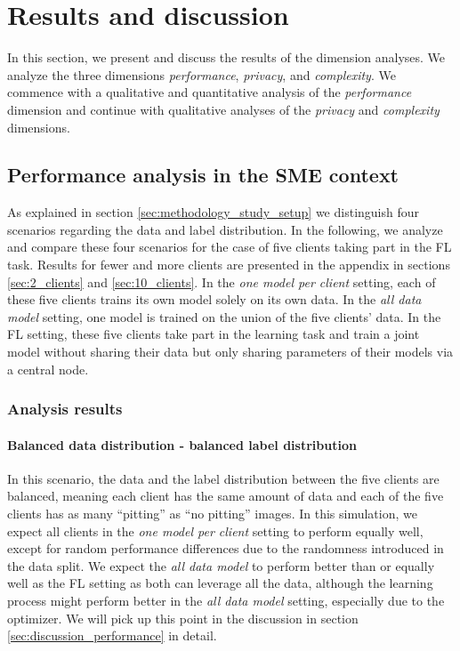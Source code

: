 \section{Results and discussion\label{sec:results_and_discussion}}
In this section, we present and discuss the results of the dimension analyses. We analyze the three dimensions \emph{performance}, \emph{privacy}, and \emph{complexity}. We commence with a qualitative and quantitative analysis of the \emph{performance} dimension and continue with qualitative analyses of the \emph{privacy} and \emph{complexity} dimensions.

\subsection{Performance analysis in the SME context}
As explained in section \ref{sec:methodology_study_setup} we distinguish four scenarios regarding the data and label distribution. In the following, we analyze and compare these four scenarios for the case of five clients taking part in the FL task. Results for fewer and more clients are presented in the appendix in sections \ref{sec:2_clients} and \ref{sec:10_clients}. In the \emph{one model per client} setting, each of these five clients trains its own model solely on its own data. In the \emph{all data model} setting, one model is trained on the union of the five clients' data. In the FL setting, these five clients take part in the learning task and train a joint model without sharing their data but only sharing parameters of their models via a central node.

\subsubsection{Analysis results\label{sec:analysis_results}}
\paragraph*{Balanced data distribution - balanced label distribution} In this scenario, the data and the label distribution between the five clients are balanced, meaning each client has the same amount of data and each of the five clients has as many ``pitting'' as ``no pitting'' images.
In this simulation, we expect all clients in the \emph{one model per client} setting to perform equally well, except for random performance differences due to the randomness introduced in the data split. We expect the \emph{all data model} to perform better than or equally well as the FL setting as both can leverage all the data, although the learning process might perform better in the \emph{all data model} setting, especially due to the optimizer. We will pick up this point in the discussion in section \ref{sec:discussion_performance} in detail.

